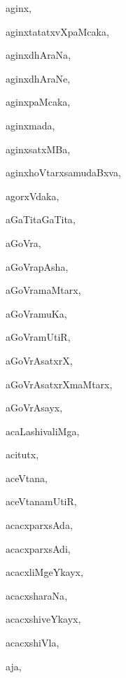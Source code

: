 \begin{multicols}{3}
{\noindent
{aginx}, \pageref{aginx}

\noindent
{aginxtatatxvXpaMcaka}, \pageref{aginxtatatxvXpaMcaka}

\noindent
{aginxdhAraNa}, \pageref{aginxdhAraNa}

\noindent
{aginxdhAraNe}, \pageref{aginxdhAraNe}

\noindent
{aginxpaMcaka}, \pageref{aginxpaMcaka}

\noindent
{aginxmada}, \pageref{aginxmada}

\noindent
{aginxsatxMBa}, \pageref{aginxsatxMBa}

\noindent
{aginxhoVtarxsamudaBxva}, \pageref{aginxhoVtarxsamudaBxva}

\noindent
{agorxVdaka}, \pageref{agorxVdaka}

\noindent
{aGaTitaGaTita}, \pageref{aGaTitaGaTita}

\noindent
{aGoVra}, \pageref{aGoVra}

\noindent
{aGoVrapAsha}, \pageref{aGoVrapAsha}

\noindent
{aGoVramaMtarx}, \pageref{aGoVramaMtarx}

\noindent
{aGoVramuKa}, \pageref{aGoVramuKa}

\noindent
{aGoVramUtiR}, \pageref{aGoVramUtiR}

\noindent
{aGoVrAsatxrX}, \pageref{aGoVrAsatxrX}

\noindent
{aGoVrAsatxrXmaMtarx}, \pageref{aGoVrAsatxrXmaMtarx}

\noindent
{aGoVrAsayx}, \pageref{aGoVrAsayx}

\noindent
{acaLashivaliMga}, \pageref{acaLashivaliMga}

\noindent
{acitutx}, \pageref{acitutx}

\noindent
{aceVtana}, \pageref{aceVtana}

\noindent
{aceVtanamUtiR}, \pageref{aceVtanamUtiR}

\noindent
{acacxparxsAda}, \pageref{acacxparxsAda}

\noindent
{acacxparxsAdi}, \pageref{acacxparxsAdi}

\noindent
{acacxliMgeYkayx}, \pageref{acacxliMgeYkayx}

\noindent
{acacxsharaNa}, \pageref{acacxsharaNa}

\noindent
{acacxshiveYkayx}, \pageref{acacxshiveYkayx}

\noindent
{acacxshiVla}, \pageref{acacxshiVla}

\noindent
{aja}, \pageref{aja}

}
\end{multicols}
